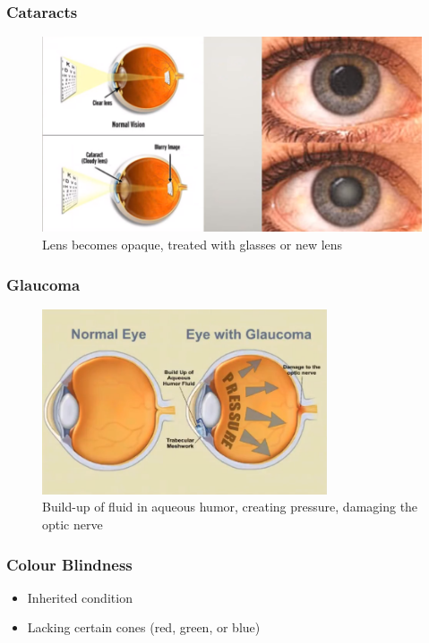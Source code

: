 \documentclass[a4paper,12pt]{article}
\begin{document}
\subsubsection{Cataracts}
\begin{figure}[H]
    \centering
    \includegraphics[width=\textwidth]{cataracts}
    \caption{Lens becomes opaque, treated with glasses or new lens}
\end{figure}

\subsubsection{Glaucoma}
\begin{figure}[H]
    \centering
    \includegraphics[width=0.75\textwidth]{glaucoma}
    \caption{Build-up of fluid in aqueous humor, creating pressure, damaging the optic nerve}
\end{figure}

\subsubsection{Colour Blindness}
\begin{itemize}
    \item{Inherited condition}
    \item{Lacking certain cones (red, green, or blue)}
\end{itemize}
\end{document}

